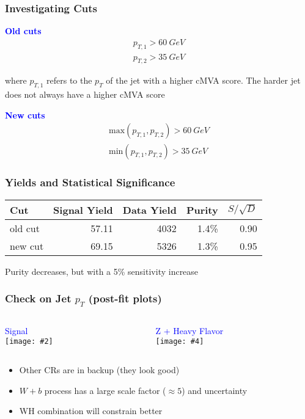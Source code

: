 \documentclass{beamer}
\newcommand{\twofigs}[4]{
  \begin{columns}
    \begin{column}{0.5\linewidth}
      \centering
      \textcolor{blue}{#1} \\
      \texttt{[image: \#2]}
    \end{column}
    \begin{column}{0.5\linewidth}
      \centering
      \textcolor{blue}{#3} \\
      \texttt{[image: \#4]}
    \end{column}
  \end{columns}
}
\begin{document}
\begin{frame}
  \frametitle{Investigating Cuts}

  {\centering \bf
    \Large{\textcolor{blue}{Old cuts}}
    \begin{gather*}
      p_{T,1} > \SI{60}{GeV} \\
      p_{T,2} > \SI{35}{GeV}
    \end{gather*}
  }

  where $p_{T,1}$ refers to the $p_T$ of the jet with a higher cMVA score.
  The harder jet does not always have a higher cMVA score

  {\centering \bf
    \Large{\textcolor{blue}{New cuts}}
    \begin{gather*}
      \mathrm{max}(p_{T,1}, p_{T,2}) > \SI{60}{GeV} \\
      \mathrm{min}(p_{T,1}, p_{T,2}) > \SI{35}{GeV}
    \end{gather*}
  }

\end{frame}

\begin{frame}
  \frametitle{Yields and Statistical Significance}

  \centering

  \begin{center}
    \begin{tabular}{|l|r|r|r|r|}
      \hline
      Cut & Signal Yield & Data Yield & Purity & $S/\sqrt{D}$ \\
      \hline
      old cut & 57.11 & 4032 & 1.4\% & 0.90 \\
      new cut & 69.15 & 5326 & 1.3\% & 0.95 \\
      \hline
    \end{tabular}
  \end{center}

  Purity decreases, but with a 5\% sensitivity increase

\end{frame}

\begin{frame}
  \frametitle{Check on Jet $p_T$ (post-fit plots)}

  \twofigs{Signal}
          {180514_old/inclusive_signal_cmva_jet1_pt.pdf}
          {Z + Heavy Flavor}
          {180514_old/inclusive_heavyz_cmva_jet1_pt.pdf}

  \begin{itemize}
  \item Other CRs are in backup (they look good)
  \item $W + b$ process has a large scale factor ($\approx 5$) and uncertainty
  \item WH combination will constrain better
  \end{itemize}

\end{frame}
\end{document}
